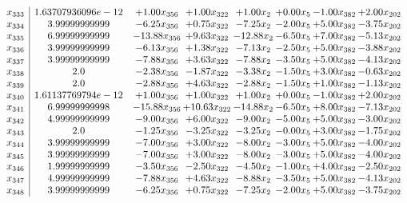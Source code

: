 \documentclass[8pt]{article}
\begin{document}
\[\begin{array}{c| c c@{\hskip 2pt} c@{\hskip 2pt} c@{\hskip 2pt} c@{\hskip 2pt} c@{\hskip 2pt} c@{\hskip 2pt} }
 x_{333}   &  1.63707936096e-12 & +  1.00 x_{356} & +  1.00 x_{322} & +  1.00 x_{2} & +  0.00 x_{5} & -1.00 x_{382} & +  2.00 x_{202}\\
 x_{334}   &  3.99999999999 & -6.25 x_{356} & +  0.75 x_{322} & -7.25 x_{2} & -2.00 x_{5} & +  5.00 x_{382} & -3.75 x_{202}\\
 x_{335}   &  6.99999999999 & -13.88 x_{356} & +  9.63 x_{322} & -12.88 x_{2} & -6.50 x_{5} & +  7.00 x_{382} & -5.13 x_{202}\\
 x_{336}   &  3.99999999999 & -6.13 x_{356} & +  1.38 x_{322} & -7.13 x_{2} & -2.50 x_{5} & +  5.00 x_{382} & -3.88 x_{202}\\
 x_{337}   &  3.99999999999 & -7.88 x_{356} & +  3.63 x_{322} & -7.88 x_{2} & -3.50 x_{5} & +  5.00 x_{382} & -4.13 x_{202}\\
 x_{338}   &  2.0 & -2.38 x_{356} & -1.87 x_{322} & -3.38 x_{2} & -1.50 x_{5} & +  3.00 x_{382} & -0.63 x_{202}\\
 x_{339}   &  2.0 & -2.88 x_{356} & +  4.63 x_{322} & -2.88 x_{2} & -1.50 x_{5} & +  1.00 x_{382} & -1.13 x_{202}\\
 x_{340}   &  1.61137769794e-12 & +  1.00 x_{356} & +  1.00 x_{322} & +  1.00 x_{2} & +  0.00 x_{5} & -1.00 x_{382} & +  2.00 x_{202}\\
 x_{341}   &  6.99999999998 & -15.88 x_{356} & + 10.63 x_{322} & -14.88 x_{2} & -6.50 x_{5} & +  8.00 x_{382} & -7.13 x_{202}\\
 x_{342}   &  4.99999999999 & -9.00 x_{356} & +  6.00 x_{322} & -9.00 x_{2} & -5.00 x_{5} & +  5.00 x_{382} & -3.00 x_{202}\\
 x_{343}   &  2.0 & -1.25 x_{356} & -3.25 x_{322} & -3.25 x_{2} & -0.00 x_{5} & +  3.00 x_{382} & -1.75 x_{202}\\
 x_{344}   &  3.99999999999 & -7.00 x_{356} & +  3.00 x_{322} & -8.00 x_{2} & -3.00 x_{5} & +  5.00 x_{382} & -4.00 x_{202}\\
 x_{345}   &  3.99999999999 & -7.00 x_{356} & +  3.00 x_{322} & -8.00 x_{2} & -3.00 x_{5} & +  5.00 x_{382} & -4.00 x_{202}\\
 x_{346}   &  1.99999999999 & -3.50 x_{356} & -2.50 x_{322} & -4.50 x_{2} & -1.00 x_{5} & +  4.00 x_{382} & -2.50 x_{202}\\
 x_{347}   &  4.99999999999 & -7.88 x_{356} & +  4.63 x_{322} & -8.88 x_{2} & -3.50 x_{5} & +  5.00 x_{382} & -4.13 x_{202}\\
 x_{348}   &  3.99999999999 & -6.25 x_{356} & +  0.75 x_{322} & -7.25 x_{2} & -2.00 x_{5} & +  5.00 x_{382} & -3.75 x_{202}\\

\end{array}\]
\end{document}

